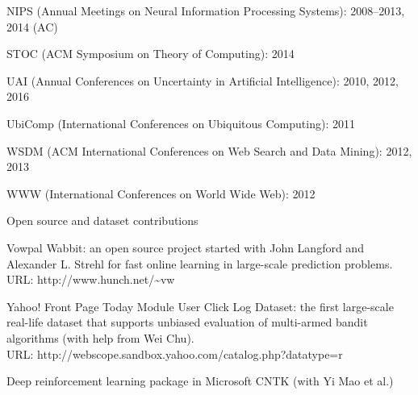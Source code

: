 \documentclass[10pt,twoside,letterpaper]{article}
\newcommand{\negitemspace}{\vspace{1mm}}
\begin{document}
\begin{compactitem}
\begin{compactitem}
\item{NIPS (Annual Meetings on Neural Information Processing Systems): 2008--2013, 2014 (AC)}

\item{STOC (ACM Symposium on Theory of Computing): 2014}

\item{UAI (Annual Conferences on Uncertainty in Artificial
Intelligence): 2010, 2012, 2016}

\item{UbiComp (International Conferences on Ubiquitous Computing): 2011}

\item{WSDM (ACM International Conferences on Web Search and Data Mining): 2012, 2013}

\item{WWW (International Conferences on World Wide Web): 2012}

\end{compactitem} \negitemspace


\item{Open source and dataset contributions} \negitemspace

\begin{compactitem}

\item{Vowpal Wabbit: an open source project started with John Langford and
Alexander L. Strehl for fast online learning in large-scale
prediction problems.  URL: http://www.hunch.net/\~{}vw~}

\item{Yahoo! Front Page Today Module User Click Log Dataset: the first large-scale real-life dataset that supports unbiased evaluation of multi-armed bandit algorithms (with help from Wei Chu).  \\ URL: http://webscope.sandbox.yahoo.com/catalog.php?datatype=r}

\item{Deep reinforcement learning package in Microsoft CNTK (with Yi Mao et al.)}

\end{compactitem} \negitemspace

\end{compactitem}
\end{document}
